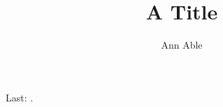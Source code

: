 \documentclass{article}
\title{A Title}\author{Ann Able}
\affil{Univ X}
\begin{document}
\maketitle Last: \lastaff.
\end{document}
